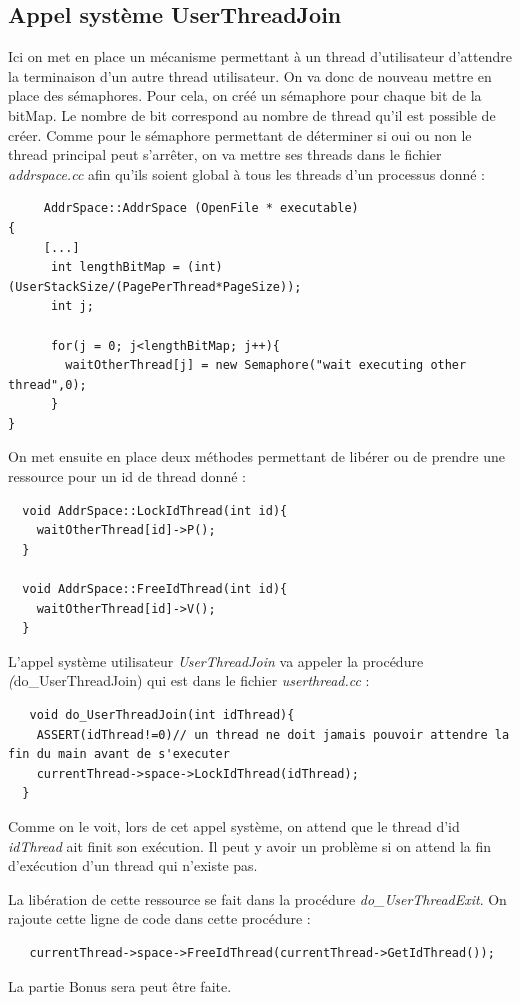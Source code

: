 \documentclass[a4paper,10pt]{article}
\begin{document}
    \subsection{Appel système UserThreadJoin}
    Ici on met en place un mécanisme permettant à un thread d'utilisateur d'attendre la terminaison d'un autre thread utilisateur. On va donc de nouveau mettre
    en place des sémaphores.
    Pour cela, on créé un sémaphore pour chaque bit de la bitMap. Le nombre de bit correspond au nombre de thread qu'il est possible de créer. Comme pour 
    le sémaphore permettant de déterminer si oui ou non le thread principal peut s'arrêter, on va mettre ses threads dans le fichier \emph{addrspace.cc} afin
    qu'ils soient global à tous les threads d'un processus donné :
    \begin{lstlisting}
     AddrSpace::AddrSpace (OpenFile * executable)
{
     [...]
      int lengthBitMap = (int)(UserStackSize/(PagePerThread*PageSize));
      int j;

      for(j = 0; j<lengthBitMap; j++){
        waitOtherThread[j] = new Semaphore("wait executing other thread",0);
      }
}
    \end{lstlisting}
\newpage
    On met ensuite en place deux méthodes permettant de libérer ou de prendre une ressource pour un id de thread donné :
    \begin{lstlisting}
  void AddrSpace::LockIdThread(int id){
    waitOtherThread[id]->P();
  }

  void AddrSpace::FreeIdThread(int id){
    waitOtherThread[id]->V();
  }
    \end{lstlisting}
  L'appel système utilisateur \emph{UserThreadJoin} va appeler la procédure \emph(do\_UserThreadJoin) qui est dans le fichier \emph{userthread.cc} :
  \begin{lstlisting}
   void do_UserThreadJoin(int idThread){
	ASSERT(idThread!=0)// un thread ne doit jamais pouvoir attendre la fin du main avant de s'executer
	currentThread->space->LockIdThread(idThread);
  }
  \end{lstlisting}
  Comme on le voit, lors de cet appel système, on attend que le thread d'id \emph{idThread} ait finit son exécution. Il peut y avoir un problème si on 
  attend la fin d'exécution d'un thread qui n'existe pas.
  
  La libération de cette ressource se fait dans la procédure \emph{do\_UserThreadExit}. On rajoute cette ligne de code dans cette procédure :
  \begin{lstlisting}
   currentThread->space->FreeIdThread(currentThread->GetIdThread());
  \end{lstlisting}
  
  La partie Bonus sera peut être faite.
\end{document}
